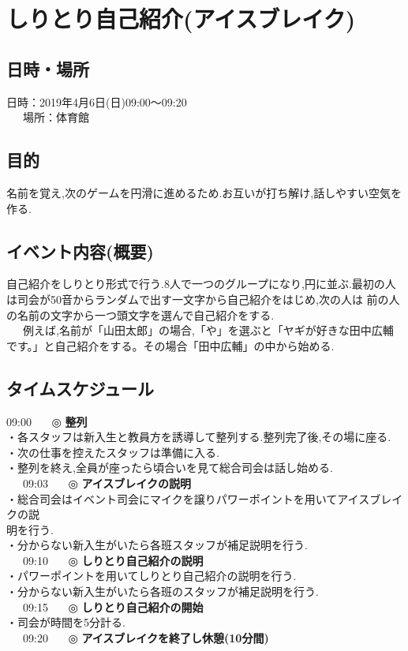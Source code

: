 \section{しりとり自己紹介(アイスブレイク)}
\subsection{日時・場所}
日時：2019年4月6日(日)09:00〜09:20\\
\ \ \ 場所：体育館\\

\subsection{目的}
名前を覚え,次のゲームを円滑に進めるため.お互いが打ち解け,話しやすい空気を作る.
\subsection{イベント内容(概要)}
自己紹介をしりとり形式で行う.8人で一つのグループになり,円に並ぶ.最初の人は司会が50音からランダムで出す一文字から自己紹介をはじめ,次の人は
前の人の名前の文字から一つ頭文字を選んで自己紹介をする.\\
\ \ \ 例えば,名前が「山田太郎」の場合,「や」を選ぶと「ヤギが好きな田中広輔です。」と自己紹介をする。その場合「田中広輔」の中から始める.
\subsection{タイムスケジュール}
09:00 \ \ \ ◎ \textbf{整列} \\
\hspace{15mm}・各スタッフは新入生と教員方を誘導して整列する.整列完了後,その場に座る.\\
\hspace{15mm}・次の仕事を控えたスタッフは準備に入る.\\
\hspace{15mm}・整列を終え,全員が座ったら頃合いを見て総合司会は話し始める.\\
\ \ \ 09:03 \ \ \ ◎ \textbf{アイスブレイクの説明}\\
\hspace{15mm}・総合司会はイベント司会にマイクを譲りパワーポイントを用いてアイスブレイクの説\\
\hspace{15mm}明を行う.\\
\hspace{15mm}・分からない新入生がいたら各班スタッフが補足説明を行う.\\
\ \ \ 09:10 \ \ \ ◎ \textbf{しりとり自己紹介の説明}\\
\hspace{15mm}・パワーポイントを用いてしりとり自己紹介の説明を行う.\\
\hspace{15mm}・分からない新入生がいたら各班のスタッフが補足説明を行う.\\
\ \ \ 09:15 \ \ \ ◎ \textbf{しりとり自己紹介の開始}\\
\hspace{15mm}・司会が時間を5分計る.\\
\ \ \ 09:20 \ \ \ ◎ \textbf{アイスブレイクを終了し休憩(10分間)} \\

